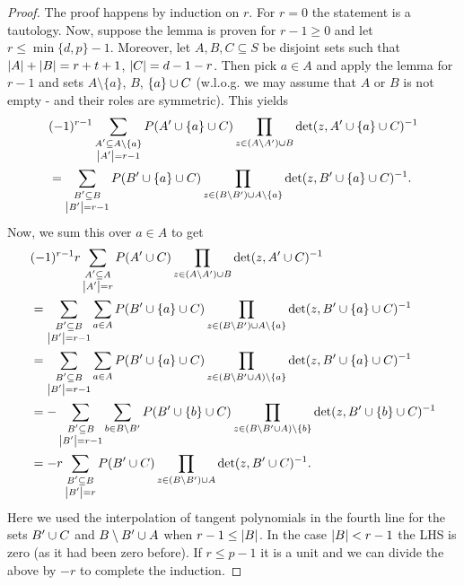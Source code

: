\documentclass[a4paper]{article}
\begin{document}
\begin{proof}
  The proof happens by induction on $r$. For $r=0$ the statement is a
  tautology.
  Now, suppose the lemma is proven for $r-1\geq 0$ and let
  $r\leq\min\{d,p\}-1$.
  Moreover, let $A,B,C\subseteq S$ be disjoint sets such
  that $\left|A\right|+\left|B\right|=r+t+1$, $\left|C\right|=d-1-r$. Then pick $a\in A$ and
  apply the lemma for $r-1$ and sets $A\setminus\{a\}$, $B$,
  $\{a\}\cup C$ (w.l.o.g. we may assume that $A$ or $B$ is not empty
  - and their roles are symmetric).
  This yields
  \begin{align*}
    &(-1)^{r-1}\sum_{\substack{A'\subseteq A\setminus\{a\}\\ \left|A'\right|=r-1}}{P(A'\cup\{a\}\cup C)\prod_{z\in (A\setminus A')\cup B}{\det(z,A'\cup\{a\}\cup C)^{-1}}}\\
    &= \sum_{\substack{B'\subseteq B\\ \left|B'\right|=r-1}}{P(B'\cup\{a\}\cup C)\prod_{z\in (B\setminus B')\cup A\setminus\{a\}}{\det(z,B'\cup\{a\}\cup C)^{-1}}}\text{.}
  \end{align*}
  Now, we sum this over $a\in A$ to get
  \begin{align*}
    &(-1)^{r-1}r\sum_{\substack{A'\subseteq A\\ \left|A'\right|=r}}{P(A'\cup C)\prod_{z\in (A\setminus A')\cup B}{\det(z,A'\cup C)^{-1}}}\\
    &= \sum_{\substack{B'\subseteq B\\ \left|B'\right|=r-1}}{\sum_{a\in A}{P(B'\cup\{a\}\cup C)\prod_{z\in (B\setminus B')\cup A\setminus\{a\}}{\det(z,B'\cup\{a\}\cup C)^{-1}}}}\\
    &= \sum_{\substack{B'\subseteq B\\ \left|B'\right|=r-1}}{\sum_{a\in A}{P(B'\cup\{a\}\cup C)\prod_{z\in (B\setminus B'\cup A)\setminus\{a\}}{\det(z,B'\cup\{a\}\cup C)^{-1}}}}\\
    &= -\sum_{\substack{B'\subseteq B\\ \left|B'\right|=r-1}}{\sum_{b\in B\setminus B'}{P(B'\cup\{b\}\cup C)\prod_{z\in(B\setminus B'\cup A)\setminus\{b\}}{\det(z,B'\cup\{b\}\cup C)^{-1}}}}\\
    &= -r\sum_{\substack{B'\subseteq B\\ \left|B'\right|=r}}{P(B'\cup C)\prod_{z\in (B\setminus B')\cup A}{\det(z,B'\cup C)^{-1}}}\text{.}
  \end{align*}
  Here we used the interpolation of tangent polynomials in the fourth
  line for the sets $B'\cup C$ and $B\setminus B'\cup A$ when
  $r-1\leq\left|B\right|$. In the case $\left|B\right|< r-1$ the LHS is zero (as it
  had been zero before).
  If $r\leq p-1$ it is a unit and we can divide the above by $-r$ to complete
  the induction.
\end{proof}
\end{document}
